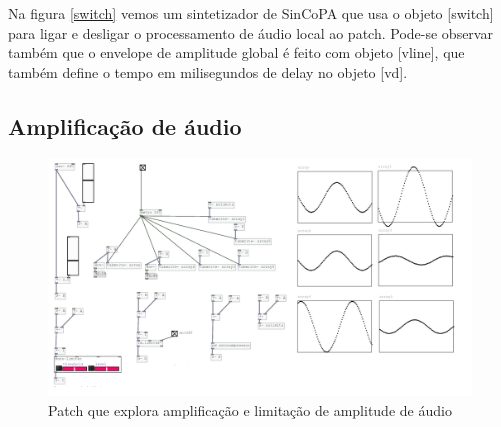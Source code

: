 \documentclass{ppgmus}
\begin{document}
Na figura \ref{switch} vemos um sintetizador de SinCoPA que usa o objeto [switch\texttildelow] para
ligar e desligar o processamento de áudio local ao patch. Pode-se observar também que o envelope
de amplitude global é feito com objeto [vline\texttildelow], que também define o tempo
em milisegundos de delay no objeto [vd\texttildelow].
 

\subsection{Amplificação de áudio}


\begin{figure}
\includegraphics[scale=.5]{limiter}
\caption{Patch que explora amplificação e limitação de amplitude de áudio}
\label{limiter}
\end{figure}
\end{document}
